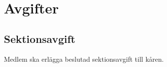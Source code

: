 \section{Avgifter}
\subsection{Sektionsavgift}
Medlem ska erlägga beslutad sektionsavgift till kåren.
